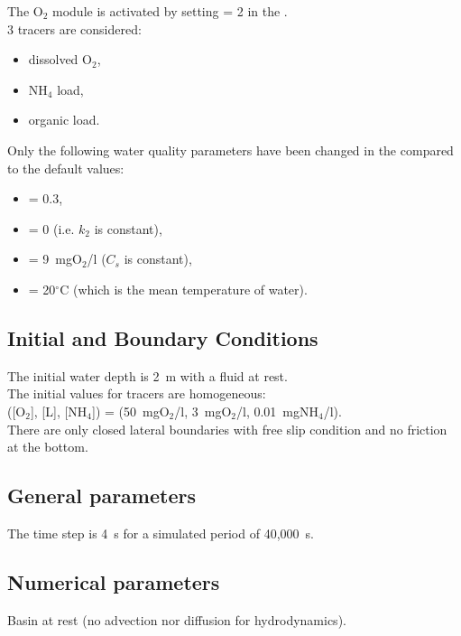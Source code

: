 The O$_2$ module is activated by setting  = 2
in the  .\\

3 tracers are considered:
\begin{itemize}
\item dissolved O$_2$,
\item NH$_4$ load,
\item organic load.
\end{itemize}

Only the following water quality parameters have been changed
in the \waqtel {} compared to the default values:
\begin{itemize}
\item {} = 0.3,
\item {} = 0 (i.e. $k_2$ is constant),
\item {} = 9~mgO$_2$/l ($C_s$ is constant),
\item {} = 20$^\circ$C (which is the mean temperature of water).
\end{itemize}

\subsection{Initial and Boundary Conditions}

The initial water depth is 2~m with a fluid at rest.\\
%
The initial values for tracers are homogeneous:\\
([O$_2$], [L], [NH$_4$]) =
(50~mgO$_2$/l, 3~mgO$_2$/l, 0.01~mgNH$_4$/l).\\
%
There are only closed lateral boundaries with free slip condition and no
friction at the bottom.

\subsection{General parameters}

The time step is 4~s for a simulated period of 40,000~s.

\subsection{Numerical parameters}

Basin at rest (no advection nor diffusion for hydrodynamics).\\

